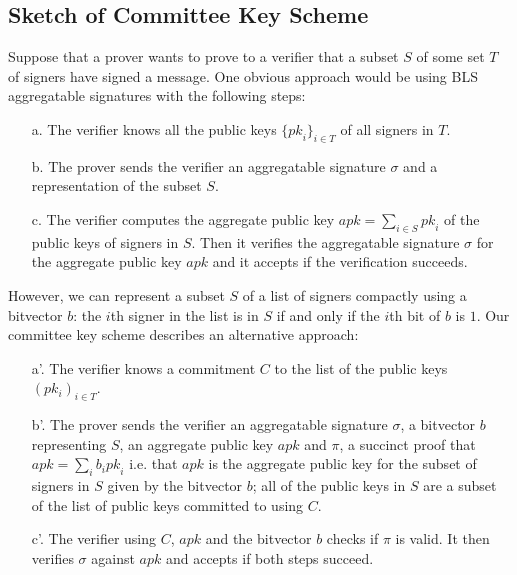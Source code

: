 \subsection{Sketch of Committee Key Scheme}

\noindent Suppose that a prover wants to prove to a verifier that a subset $S$ of some set $T$ of signers have signed a message. 
One obvious approach would be using BLS aggregatable signatures with the following steps:

\begin{itemize}
\item[a.] The verifier knows all the public keys $\{\mathit{pk}_i\}_{i \in T}$ of all signers in $T$.

\item[b.] The prover sends the verifier an aggregatable signature $\sigma$ and a representation of the subset $S$.

\item[c.] The verifier computes the aggregate public key $\mathit{apk}=\sum_{i \in S} \mathit{pk}_i$ of the public keys of signers in $S$. 
Then it verifies the aggregatable signature $\sigma$ for the aggregate public key $\mathit{apk}$ and it accepts if the verification succeeds.
\end{itemize}

\noindent However, we can represent a subset $S$ of a list of signers compactly using a bitvector $b$: 
the $i$th signer in the list is in $S$ if and only if the $i$th bit of $b$ is $1$. Our committee key scheme describes an alternative approach:

\begin{itemize}
\item[a'.] The verifier knows a commitment $C$ to the list of the public keys $(pk_i)_{i \in T}$.

\item[b'.] The prover sends the verifier an aggregatable signature $\sigma$, a bitvector $b$ representing $S$, an aggregate public key 
$\mathit{apk}$ and $\pi$, a succinct proof that $\mathit{apk}=\sum_i b_i \mathit{pk}_i$ i.e. 
that $\mathit{apk}$ is the aggregate public key for the subset of signers in $S$ given by the bitvector $b$; all of the public keys in $S$ are a subset 
of the list of public keys committed to using $C$.

\item[c'.] The verifier using $C$, $\mathit{apk}$ and the bitvector $b$ checks if $\pi$ is valid. 
It then verifies $\sigma$ against $\mathit{apk}$ and accepts if both steps succeed.
\end{itemize}

